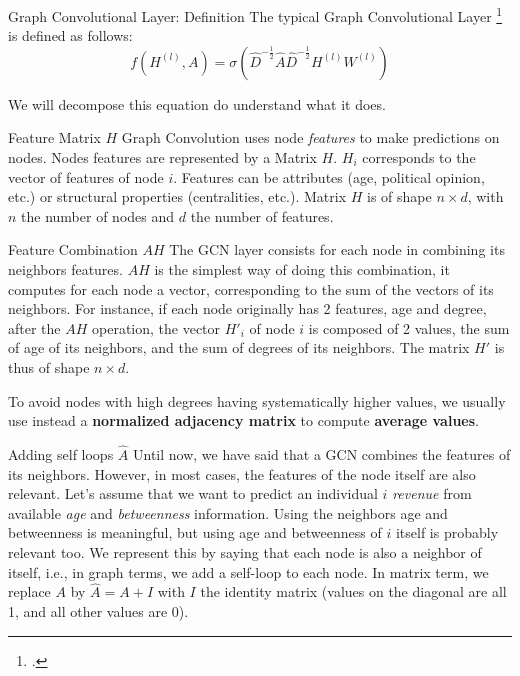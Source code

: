 \documentclass[a4paper,11pt]{book}
\begin{document}
\begin{textbox}{Graph Convolutional Layer: Definition}
The typical Graph Convolutional Layer \footcite{kipf2016semi} is defined as follows:
\[
f(H^{(l)}, A) = \sigma\left( \hat{D}^{-\frac{1}{2}}\hat{A}\hat{D}^{-\frac{1}{2}}H^{(l)}W^{(l)}\right)
\]

We will decompose this equation do understand what it does.

\end{textbox}

\begin{textbox}{Feature Matrix $H$}
Graph Convolution uses node \textit{features} to make predictions on nodes. Nodes features are represented by a Matrix $H$. $H_i$ corresponds to the vector of features of node $i$. Features can be attributes (age, political opinion, etc.) or structural properties (centralities, etc.). Matrix $H$ is of shape $n\times d$, with $n$ the number of nodes and $d$ the number of features.
\end{textbox}


\begin{textbox}{Feature Combination $AH$}
The GCN layer consists for each node in combining its neighbors features. $AH$ is the simplest way of doing this combination, it computes for each node a vector, corresponding to the sum of the vectors of its neighbors. For instance, if each node originally has 2 features, age and degree, after the $AH$ operation, the vector $H'_i$ of node $i$ is composed of 2 values, the sum of age of its neighbors, and the sum of degrees of its neighbors. The matrix $H'$ is thus of shape $n\times d$. 

To avoid nodes with high degrees having systematically higher values, we usually use instead a \textbf{normalized adjacency matrix} to compute \textbf{average values}.
\end{textbox}


\begin{textbox}{Adding self loops $\hat{A}$}
Until now, we have said that a GCN combines the features of its neighbors. However, in most cases, the features of the node itself are also relevant. Let's assume that we want to predict an individual $i$ \textit{revenue} from available \textit{age} and \textit{betweenness} information. Using the neighbors age and betweenness is meaningful, but using age and betweenness of $i$ itself is probably relevant too. We represent this by saying that each node is also a neighbor of itself, i.e., in graph terms, we add a self-loop to each node. In matrix term, we replace $A$ by $\hat{A}=A+I$ with $I$ the identity matrix (values on the diagonal are all 1, and all other values are 0).
\end{textbox}
\end{document}
